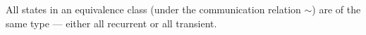 All states in an equivalence class (under the communication relation $\sim$) are of the same type — either all recurrent or all transient.
